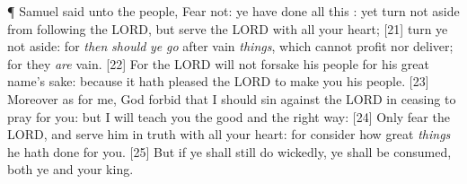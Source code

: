 \P \textcolor[cmyk]{0.99998,1,0,0}{ Samuel said unto the people, Fear not: ye have done all this : yet turn not aside from following the LORD, but serve the LORD with all your heart;}
[21] \textcolor[cmyk]{0.99998,1,0,0}{ turn ye not aside: for \emph{then} \emph{should} \emph{ye} \emph{go} after vain \emph{things}, which cannot profit nor deliver; for they \emph{are} vain.}
[22] \textcolor[cmyk]{0.99998,1,0,0}{For the LORD will not forsake his people for his great name's sake: because it hath pleased the LORD to make you his people.}
[23] \textcolor[cmyk]{0.99998,1,0,0}{Moreover as for me, God forbid that I should sin against the LORD in ceasing to pray for you: but I will teach you the good and the right way:}
[24] \textcolor[cmyk]{0.99998,1,0,0}{Only fear the LORD, and serve him in truth with all your heart: for consider how great \emph{things} he hath done for you.}
[25] \textcolor[cmyk]{0.99998,1,0,0}{But if ye shall still do wickedly, ye shall be consumed, both ye and your king.}